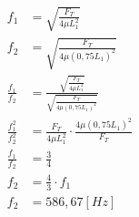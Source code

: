 %
%
    \begin{equation*}
        \begin{aligned}
            f_1                   & =\sqrt{\frac{F_T}{4 \mu L_1 ^2}}                                               \\
            f_2                   & =\sqrt{\frac{F_T}{4 \mu (0,75 L_1)^2}}                                         \\
            \frac{f_1}{f_2}       & =\frac{\sqrt{\frac{F_T}{4 \mu L_1 ^2}}}{\sqrt{\frac{F_T}{4 \mu (0,75 L_1)^2}}} \\
            \frac{f_1 ^2}{f_2 ^2} & =\frac{F_T}{4 \mu L_1 ^2}  \cdot \frac{4 \mu (0,75 L_1)^2}{F_T}                \\
            \frac{f_1}{f_2}       & =\frac{3}{4}                                                                   \\
            f_2                   & =\frac{4}{3} \cdot f_1                                                         \\
            f_2                   & =586,67[Hz]
        \end{aligned}
    \end{equation*}

